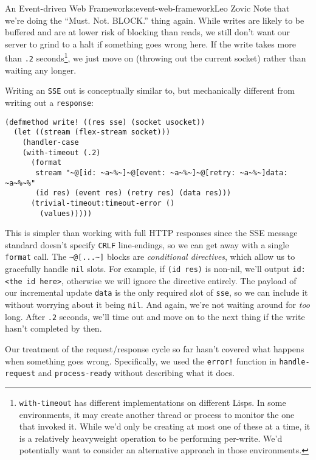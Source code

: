 \begin{aosachapter}{An Event-driven Web Framework}{s:event-web-framework}{Leo Zovic}
Note that we're doing the ``Must. Not. BLOCK.'' thing again. While
writes are likely to be buffered and are at lower risk of blocking than
reads, we still don't want our server to grind to a halt if something
goes wrong here. If the write takes more than \texttt{.2}
seconds\footnote{\texttt{with-timeout} has different implementations on
  different Lisps. In some environments, it may create another thread or
  process to monitor the one that invoked it. While we'd only be
  creating at most one of these at a time, it is a relatively
  heavyweight operation to be performing per-write. We'd potentially
  want to consider an alternative approach in those environments.}, we
just move on (throwing out the current socket) rather than waiting any
longer.

Writing an \texttt{SSE} out is conceptually similar to, but mechanically
different from writing out a \texttt{response}:

\begin{verbatim}
(defmethod write! ((res sse) (socket usocket))
  (let ((stream (flex-stream socket)))
    (handler-case
    (with-timeout (.2)
      (format
       stream "~@[id: ~a~%~]~@[event: ~a~%~]~@[retry: ~a~%~]data: ~a~%~%"
       (id res) (event res) (retry res) (data res)))
      (trivial-timeout:timeout-error ()
        (values)))))
\end{verbatim}

This is simpler than working with full HTTP responses since the SSE
message standard doesn't specify \texttt{CRLF} line-endings, so we can
get away with a single \texttt{format} call. The
\texttt{\textasciitilde{}@{[}...\textasciitilde{}{]}} blocks are
\emph{conditional directives}, which allow us to gracefully handle
\texttt{nil} slots. For example, if \texttt{(id res)} is non-nil, we'll
output \texttt{id: \textless{}the id here\textgreater{}}, otherwise we
will ignore the directive entirely. The payload of our incremental
update \texttt{data} is the only required slot of \texttt{sse}, so we
can include it without worrying about it being \texttt{nil}. And again,
we're not waiting around for \emph{too} long. After \texttt{.2} seconds,
we'll time out and move on to the next thing if the write hasn't
completed by then.

\label{error-responses}

Our treatment of the request/response cycle so far hasn't covered what
happens when something goes wrong. Specifically, we used the
\texttt{error!} function in \texttt{handle-request} and
\texttt{process-ready} without describing what it does.


\end{aosachapter}
